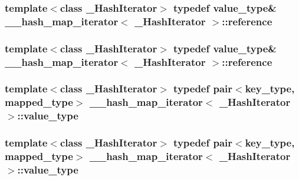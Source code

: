 \subsubsection[{reference}]{\setlength{\rightskip}{0pt plus 5cm}template$<$class \+\_\+\+Hash\+Iterator$>$ typedef {\bf value\+\_\+type}\& {\bf \+\_\+\+\_\+hash\+\_\+map\+\_\+iterator}$<$ \+\_\+\+Hash\+Iterator $>$\+::{\bf reference}}\label{class____hash__map__iterator_a61a3f5fd8f3139155d5ceb11d125af3e}
\hypertarget{class____hash__map__iterator_a61a3f5fd8f3139155d5ceb11d125af3e}{}
\subsubsection[{reference}]{\setlength{\rightskip}{0pt plus 5cm}template$<$class \+\_\+\+Hash\+Iterator$>$ typedef {\bf value\+\_\+type}\& {\bf \+\_\+\+\_\+hash\+\_\+map\+\_\+iterator}$<$ \+\_\+\+Hash\+Iterator $>$\+::{\bf reference}}\label{class____hash__map__iterator_a61a3f5fd8f3139155d5ceb11d125af3e}
\hypertarget{class____hash__map__iterator_abffd0091a81decb8f5d64306e3dea5b8}{}
\subsubsection[{value\+\_\+type}]{\setlength{\rightskip}{0pt plus 5cm}template$<$class \+\_\+\+Hash\+Iterator$>$ typedef pair$<$key\+\_\+type, mapped\+\_\+type$>$ {\bf \+\_\+\+\_\+hash\+\_\+map\+\_\+iterator}$<$ \+\_\+\+Hash\+Iterator $>$\+::{\bf value\+\_\+type}}\label{class____hash__map__iterator_abffd0091a81decb8f5d64306e3dea5b8}
\hypertarget{class____hash__map__iterator_abffd0091a81decb8f5d64306e3dea5b8}{}
\subsubsection[{value\+\_\+type}]{\setlength{\rightskip}{0pt plus 5cm}template$<$class \+\_\+\+Hash\+Iterator$>$ typedef pair$<$key\+\_\+type, mapped\+\_\+type$>$ {\bf \+\_\+\+\_\+hash\+\_\+map\+\_\+iterator}$<$ \+\_\+\+Hash\+Iterator $>$\+::{\bf value\+\_\+type}}\label{class____hash__map__iterator_abffd0091a81decb8f5d64306e3dea5b8}


